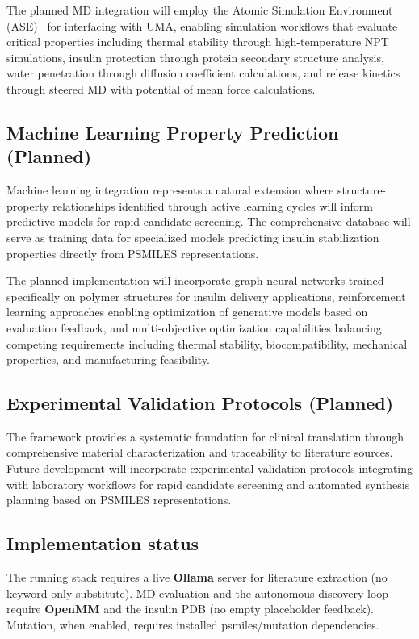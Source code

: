 \documentclass[%
 reprint,
 amsmath,amssymb,
 aps,
]{revtex4-2}
\begin{document}
The planned MD integration will employ the Atomic Simulation Environment (ASE)~\cite{larsen2017atomic} for interfacing with UMA, enabling simulation workflows that evaluate critical properties including thermal stability through high-temperature NPT simulations, insulin protection through protein secondary structure analysis, water penetration through diffusion coefficient calculations, and release kinetics through steered MD with potential of mean force calculations.

\subsection{Machine Learning Property Prediction (Planned)}

Machine learning integration represents a natural extension where structure-property relationships identified through active learning cycles will inform predictive models for rapid candidate screening. The comprehensive database will serve as training data for specialized models predicting insulin stabilization properties directly from PSMILES representations.

The planned implementation will incorporate graph neural networks trained specifically on polymer structures for insulin delivery applications, reinforcement learning approaches enabling optimization of generative models based on evaluation feedback, and multi-objective optimization capabilities balancing competing requirements including thermal stability, biocompatibility, mechanical properties, and manufacturing feasibility.

\subsection{Experimental Validation Protocols (Planned)}

The framework provides a systematic foundation for clinical translation through comprehensive material characterization and traceability to literature sources. Future development will incorporate experimental validation protocols integrating with laboratory workflows for rapid candidate screening and automated synthesis planning based on PSMILES representations.

\subsection{Implementation status}

The running stack requires a live \textbf{Ollama} server for literature extraction (no keyword-only substitute). MD evaluation and the autonomous discovery loop require \textbf{OpenMM} and the insulin PDB (no empty placeholder feedback). Mutation, when enabled, requires installed psmiles/mutation dependencies.
\end{document}
